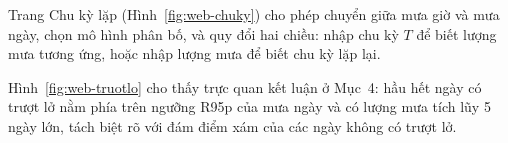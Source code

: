 
Trang Chu kỳ lặp (Hình~\ref{fig:web-chuky}) cho phép chuyển giữa mưa giờ và mưa ngày, chọn mô hình phân bố, và quy đổi hai chiều: nhập chu kỳ $T$ để biết lượng mưa tương ứng, hoặc nhập lượng mưa để biết chu kỳ lặp lại.


Hình~\ref{fig:web-truotlo} cho thấy trực quan kết luận ở Mục~4: hầu hết ngày có trượt lở nằm phía trên ngưỡng R95p của mưa ngày và có lượng mưa tích lũy 5 ngày lớn, tách biệt rõ với đám điểm xám của các ngày không có trượt lở.
